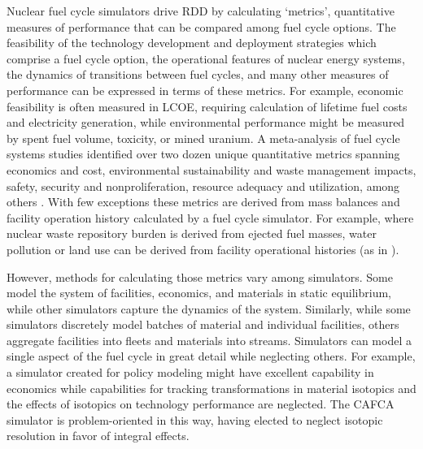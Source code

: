 Nuclear fuel cycle simulators drive \gls{RDD} by calculating `metrics',
quantitative measures of performance that can be compared among fuel cycle
options.  The feasibility of the technology development and deployment
strategies which comprise a fuel cycle option, the operational features of
nuclear energy systems, the dynamics of transitions between fuel cycles, and
many other measures of performance can be expressed in terms of these metrics.
For example, economic feasibility is often measured in \gls{LCOE}, requiring
calculation of lifetime fuel costs and electricity generation, while
environmental performance might be measured by spent fuel volume, toxicity, or
mined uranium.  A meta-analysis of fuel cycle systems studies identified over
two dozen unique quantitative metrics spanning economics and cost,
environmental sustainability and waste management impacts, safety, security and
nonproliferation, resource adequacy and utilization, among others
\cite{flicker_evaluation_2014}. With few exceptions these metrics are derived from 
mass balances and facility operation history calculated by a fuel cycle 
simulator. For example, where nuclear waste repository burden is derived from 
ejected fuel masses, water pollution or land use can be derived from facility 
operational histories (as in \cite{poinssot_assessment_2014}).

However, methods for calculating those metrics vary among simulators. Some
model the system of facilities, economics, and materials in static equilibrium,
while other simulators capture the dynamics of the system.  Similarly, while
some simulators discretely model batches of material and individual facilities,
others aggregate facilities into fleets and materials into streams. Simulators
can model a single aspect of the fuel cycle in great detail while neglecting
others. For example, a simulator created for policy modeling might have
excellent capability in economics while capabilities for tracking transformations in
material isotopics and the effects of isotopics on technology performance are
neglected.  The \gls{CAFCA}\cite{guerin_impact_2009} simulator is problem-oriented
in this way, having elected to neglect isotopic resolution in favor of
integral effects.

